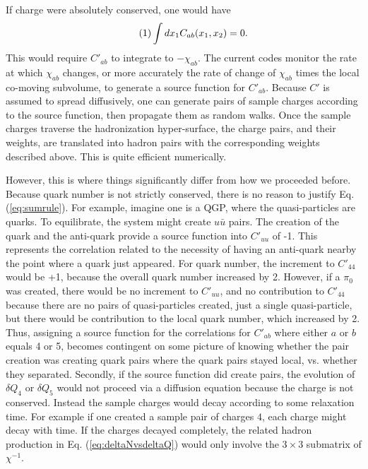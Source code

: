 \documentclass[12pt]{article}
\numberwithin{equation}{section}
\numberwithin{figure}{section}
\newcommand\eqnumber{\addtocounter{equation}{1}\tag{\theequation}}
\begin{document}
If charge were absolutely conserved, one would have
\begin{align*}\eqnumber\label{eq:sumrule}
\int dx_1 C_{ab}(x_1,x_2)=0. 
\end{align*}
This would require $C'_{ab}$ to integrate to $-\chi_{ab}$. The current codes monitor the rate at which $\chi_{ab}$ changes, or more accurately the rate of change of $\chi_{ab}$ times the local co-moving subvolume, to generate a source function for $C'_{ab}$. Because $C'$ is assumed to spread diffusively, one can generate pairs of sample charges according to the source function, then propagate them as random walks. Once the sample charges traverse the hadronization hyper-surface, the charge pairs, and their weights, are translated into hadron pairs with the corresponding weights described above. This is quite efficient numerically.

However, this is where things significantly differ from how we proceeded before. Because quark number is not strictly conserved, there is no reason to justify Eq. (\ref{eq:sumrule}). For example, imagine one is a QGP, where the quasi-particles are quarks. To equilibrate, the system might create $u\bar{u}$ pairs. The creation of the quark and the anti-quark provide a source function into $C'_{uu}$ of -1. This represents the correlation related to the necessity of having an anti-quark nearby the point where a quark just appeared. For quark number, the increment to $C'_{44}$ would be +1, because the overall quark number increased by 2. However, if a $\pi_0$ was created, there would be no increment to $C'_{uu}$, and no contribution to $C'_{44}$ because there are no pairs of quasi-particles created, just a single quasi-particle, but there would be contribution to the local quark number, which increased by 2. Thus, assigning a source function for the correlations for $C'_{ab}$ where either $a$ or $b$ equals 4 or 5, becomes contingent on some picture of knowing whether the pair creation was creating quark pairs where the quark pairs stayed local, vs. whether they separated. Secondly, if the source function did create pairs, the evolution of $\delta Q_4$ or $\delta Q_5$ would not proceed via a diffusion equation because the charge is not conserved. Instead the sample charges would decay according to some relaxation time. For example if one created a sample pair of charges $4$, each charge might decay with time. If the charges decayed completely, the related hadron production in Eq. (\ref{eq:deltaNvsdeltaQ}) would only involve the $3\times 3$ submatrix of $\chi^{-1}$.
\end{document}
